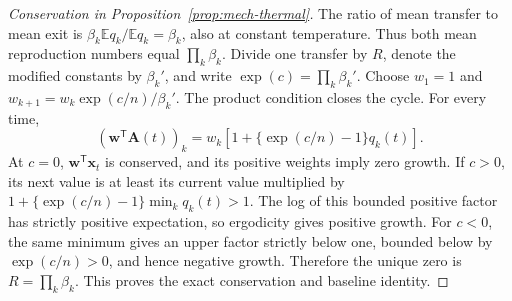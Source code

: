 \begin{proof}[Conservation in Proposition~\ref{prop:mech-thermal}]
The ratio of mean transfer to mean exit is \(\beta_k\mathbb E q_k/\mathbb E q_k=\beta_k\), also at constant temperature. Thus both mean reproduction numbers equal \(\prod_k\beta_k\). Divide one transfer by \(R\), denote the modified constants by \(\beta_k'\), and write \(\exp(c)=\prod_k\beta_k'\). Choose \(w_1=1\) and \(w_{k+1}=w_k\exp(c/n)/\beta_k'\). The product condition closes the cycle. For every time,
\[
 (\mathbf w^{\mathsf T}\mathbf A(t))_k
 =w_k[1+\{\exp(c/n)-1\}q_k(t)].
\]
At \(c=0\), \(\mathbf w^{\mathsf T}\mathbf x_t\) is conserved, and its positive weights imply zero growth. If \(c>0\), its next value is at least its current value multiplied by \(1+\{\exp(c/n)-1\}\min_kq_k(t)>1\). The log of this bounded positive factor has strictly positive expectation, so ergodicity gives positive growth. For \(c<0\), the same minimum gives an upper factor strictly below one, bounded below by \(\exp(c/n)>0\), and hence negative growth. Therefore the unique zero is \(R=\prod_k\beta_k\). This proves the exact conservation and baseline identity.
\end{proof}


